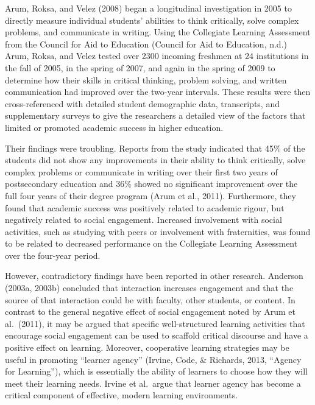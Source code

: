 \documentclass[
]{book}
\theoremstyle{definition}
\theoremstyle{definition}
\theoremstyle{definition}
\theoremstyle{definition}
\theoremstyle{remark}
\begin{document}
Arum, Roksa, and Velez (2008) began a longitudinal investigation in 2005 to directly measure individual students' abilities to think critically, solve complex problems, and communicate in writing. Using the Collegiate Learning Assessment from the Council for Aid to Education (Council for Aid to Education, n.d.) Arum, Roksa, and Velez tested over 2300 incoming freshmen at 24 institutions in the fall of 2005, in the spring of 2007, and again in the spring of 2009 to determine how their skills in critical thinking, problem solving, and written communication had improved over the two-year intervals. These results were then cross-referenced with detailed student demographic data, transcripts, and supplementary surveys to give the researchers a detailed view of the factors that limited or promoted academic success in higher education.

Their findings were troubling. Reports from the study indicated that 45\% of the students did not show any improvements in their ability to think critically, solve complex problems or communicate in writing over their first two years of postsecondary education and 36\% showed no significant improvement over the full four years of their degree program (Arum et al., 2011). Furthermore, they found that academic success was positively related to academic rigour, but negatively related to social engagement. Increased involvement with social activities, such as studying with peers or involvement with fraternities, was found to be related to decreased performance on the Collegiate Learning Assessment over the four-year period.

However, contradictory findings have been reported in other research. Anderson (2003a, 2003b) concluded that interaction increases engagement and that the source of that interaction could be with faculty, other students, or content. In contrast to the general negative effect of social engagement noted by Arum et al.~(2011), it may be argued that specific well-structured learning activities that encourage social engagement can be used to scaffold critical discourse and have a positive effect on learning. Moreover, cooperative learning strategies may be useful in promoting ``learner agency'' (Irvine, Code, \& Richards, 2013, ``Agency for Learning''), which is essentially the ability of learners to choose how they will meet their learning needs. Irvine et al.~argue that learner agency has become a critical component of effective, modern learning environments.
\end{document}
